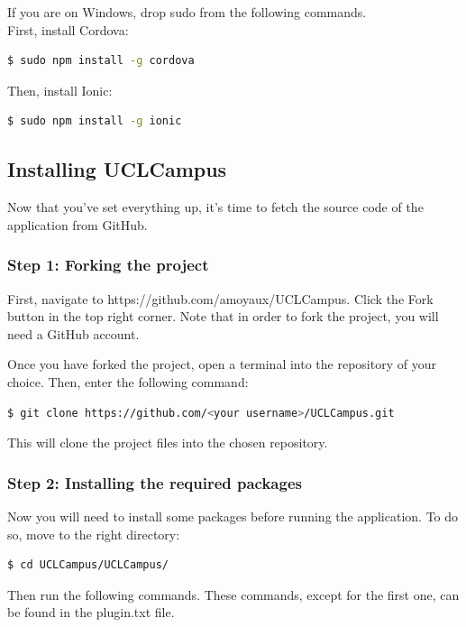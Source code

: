 \documentclass[11pt, a4paper]{report}
\begin{document}
If you are on Windows, drop sudo from the following commands.
\\First, install Cordova:
\begin{lstlisting}[language=bash]
   $ sudo npm install -g cordova
\end{lstlisting}
Then, install Ionic:
\begin{lstlisting}[language=bash]
   $ sudo npm install -g ionic
\end{lstlisting}

\subsection{Installing UCLCampus}

Now that you've set everything up, it's time to fetch the source code of the application from GitHub. 

\subsubsection{Step 1: Forking the project}

First, navigate to https://github.com/amoyaux/UCLCampus. Click the Fork button in the top right corner. Note that in order to fork the project, you will need a GitHub account.

Once you have forked the project, open a terminal into the repository of your choice. Then, enter the following command:

\begin{lstlisting}[language=bash]
   $ git clone https://github.com/<your username>/UCLCampus.git
\end{lstlisting}

This will clone the project files into the chosen repository.

\subsubsection{Step 2: Installing the required packages}

Now you will need to install some packages before running the application. To do so, move to the right directory:

\begin{lstlisting}[language=bash]
   $ cd UCLCampus/UCLCampus/
\end{lstlisting}

Then run the following commands. These commands, except for the first one, can be found in the plugin.txt file.
\end{document}
